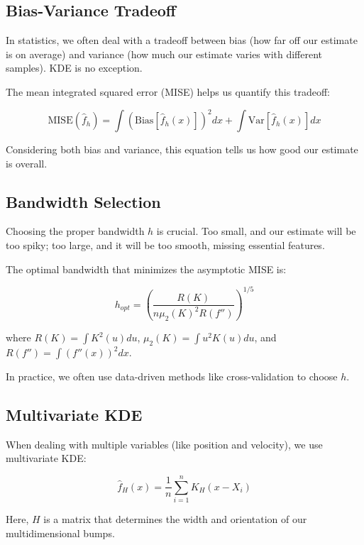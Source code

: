 \documentclass[conference]{IEEEtran}
\begin{document}
\subsection{Bias-Variance Tradeoff}

In statistics, we often deal with a tradeoff between bias (how far off our estimate is on average) and variance (how much our estimate varies with different samples). KDE is no exception.

The mean integrated squared error (MISE) helps us quantify this tradeoff:

\begin{equation}
    \text{MISE}(\hat{f}_h) = \int (\text{Bias}[\hat{f}_h(x)])^2 dx + \int \text{Var}[\hat{f}_h(x)] dx
\end{equation}

Considering both bias and variance, this equation tells us how good our estimate is overall.

\subsection{Bandwidth Selection}

Choosing the proper bandwidth $h$ is crucial. Too small, and our estimate will be too spiky; too large, and it will be too smooth, missing essential features.

The optimal bandwidth that minimizes the asymptotic MISE is:

\begin{equation}
    h_{opt} = \left(\frac{R(K)}{n \mu_2(K)^2 R(f'')}\right)^{1/5}
\end{equation}

where $R(K) = \int K^2(u) du$, $\mu_2(K) = \int u^2 K(u) du$, and $R(f'') = \int (f''(x))^2 dx$.

In practice, we often use data-driven methods like cross-validation to choose $h$.

\subsection{Multivariate KDE}

When dealing with multiple variables (like position and velocity), we use multivariate KDE:

\begin{equation}
    \hat{f}_H(x) = \frac{1}{n} \sum_{i=1}^n K_H(x - X_i)
\end{equation}

Here, $H$ is a matrix that determines the width and orientation of our multidimensional bumps.
\end{document}
